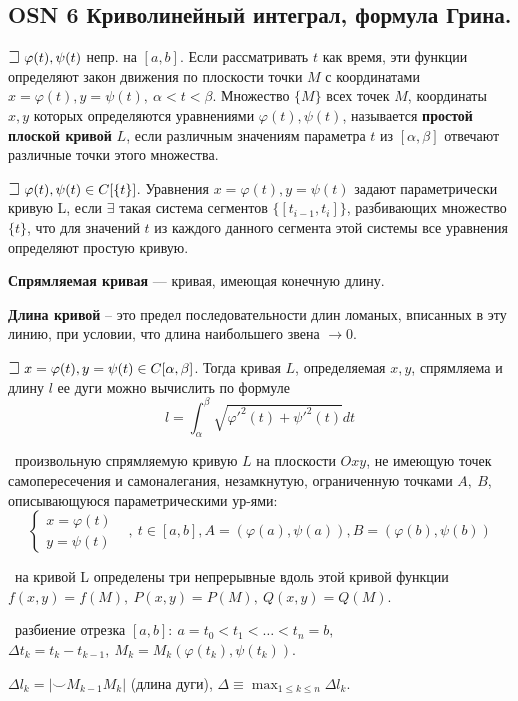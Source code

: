 \subsection{OSN 6 Криволинейный интеграл, формула Грина.}

$\mathLet ~ \varphi(t), \psi(t)$ непр. на $[a,b]$. 
Если рассматривать $t$ как время, эти функции определяют закон движения по плоскости точки $M$ с координатами 
$x = \varphi(t), y = \psi(t), ~ \alpha < t < \beta$. Множество $\{M\}$ всех точек $M$, координаты $x,y$ которых определяются уравнениями $\varphi(t), \psi(t)$, называется \textbf{простой плоской кривой} $L$, если различным значениям параметра $t$ из $[\alpha, \beta]$ отвечают различные точки этого множества.

$\mathLet ~ \varphi(t), \psi(t) \in C[\{t\}]$. Уравнения $x = \varphi(t), y = \psi(t)$ задают параметрически кривую L, если $\exists$ такая система сегментов $\{[t_{i-1}, t_i]\}$, разбивающих множество $\{t\}$, что для значений $t$ из каждого данного сегмента этой системы все уравнения определяют простую кривую.

\textbf{Спрямляемая кривая} --- кривая, имеющая конечную длину.

\textbf{Длина кривой} -- это предел последовательности длин ломаных, вписанных в эту линию, при условии, что длина наибольшего звена $\rightarrow 0$.

\bigbreak
$\mathLet ~ x = \varphi(t), y = \psi(t) \in C[\alpha, \beta]$. Тогда кривая $L$, определяемая $x, y$, спрямляема и длину $l$ ее дуги можно вычислить по формуле
$$l = \int^{\beta}_{\alpha} \sqrt{\varphi'^2(t) + \psi'^2(t)}dt$$

\faEye \ произвольную спрямляемую кривую $L$ на плоскости $Oxy$, не имеющую точек самопересечения и самоналегания, незамкнутую, ограниченную точками $A,~B$, описывающуюся параметрическими ур-ями:
$$\begin{cases} x=\varphi(t)&\\ y=\psi(t)\end{cases},~t\in [a,b], A=(\varphi(a),\psi(a)), B=(\varphi(b),\psi(b))$$

\mathLet \ на кривой L определены три непрерывные вдоль этой кривой функции $f(x,y)=f(M),~P(x,y)=P(M),~Q(x,y)=Q(M)$.

\faEye \ разбиение отрезка 
$[a,b]:~a=t_0 < t_1 < \dots < t_n = b,~$
$\Delta t_k = t_k-t_{k-1}, ~ M_k = M_k(\varphi(t_k),\psi(t_k))$.

$\Delta l_k = |\smile M_{k-1}M_k|$ (длина дуги), $\Delta \equiv \displaystyle\max_{1\leqslant k\leqslant n} \Delta l_k$.

